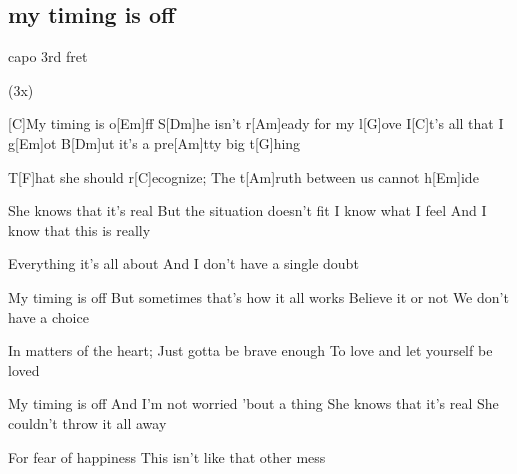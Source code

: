 \subsection*{my timing is off   }
\begin{guitar}
capo 3rd fret

 (3x)



[C]My timing is o[Em]ff
S[Dm]he isn't r[Am]eady for my l[G]ove
I[C]t's all that I g[Em]ot
B[Dm]ut it's a pre[Am]tty big t[G]hing



T[F]hat she should r[C]ecognize;
The t[Am]ruth between us cannot h[Em]ide\qquad[G]{}



She knows that it's real
But the situation doesn't fit
I know what I feel
And I know that this is really



Everything it's all about
And I don't have a single doubt



My timing is off
But sometimes that's how it all works
Believe it or not
We don't have a choice



In matters of the heart;
Just gotta be brave enough
To love and let yourself be loved



My timing is off
And I'm not worried 'bout a thing
She knows that it's real
She couldn't throw it all away



For fear of happiness
This isn't like that other mess
\end{guitar}
